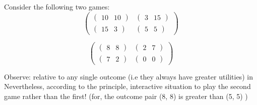 \begin{example}
    Consider the following two games: 
    \[\begin{pmatrix}
        \begin{pmatrix} 10 & 10 \end{pmatrix} & \begin{pmatrix} 3 & 15 \end{pmatrix} \\
        \begin{pmatrix} 15 & 3 \end{pmatrix} & \begin{pmatrix} 5 & 5 \end{pmatrix}
    \end{pmatrix}\]

    \[\begin{pmatrix}
        \begin{pmatrix} 8 & 8 \end{pmatrix} & \begin{pmatrix} 2 & 7 \end{pmatrix} \\
        \begin{pmatrix} 7 & 2 \end{pmatrix} & \begin{pmatrix} 0 & 0 \end{pmatrix}
    \end{pmatrix}\]

    Observe: relative to any single outcome (i.e they always have greater utilities) in
    Nevertheless, according to the principle,
    interactive situation to play the second game rather than the first! (for, the outcome pair (8, 8) is greater than (5, 5) )


\end{example}

